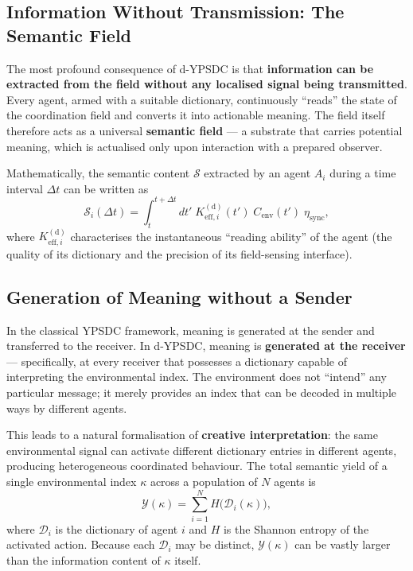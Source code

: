 \documentclass[12pt,a4paper]{article}
\theoremstyle{remark}
\begin{document}
	\subsection{Information Without Transmission: The Semantic Field}
	\label{subsec:semantic-field}
	
	The most profound consequence of d-YPSDC is that \textbf{information can be
		extracted from the field without any localised signal being transmitted}.
	Every agent, armed with a suitable dictionary, continuously ``reads'' the state
	of the coordination field and converts it into actionable meaning. The field
	itself therefore acts as a universal \textbf{semantic field} --- a substrate
	that carries potential meaning, which is actualised only upon interaction with
	a prepared observer.
	
	Mathematically, the semantic content $\mathcal{S}$ extracted by an agent $A_i$
	during a time interval $\Delta t$ can be written as
	\begin{equation}
		\mathcal{S}_i(\Delta t) = \int_{t}^{t+\Delta t} dt' \;
		K_{\mathrm{eff},i}^{\mathrm{(d)}}(t') \; C_{\mathrm{env}}(t') \; \eta_{\mathrm{sync}},
		\label{eq:semantic-content}
	\end{equation}
	where $K_{\mathrm{eff},i}^{\mathrm{(d)}}$ characterises the instantaneous
	``reading ability'' of the agent (the quality of its dictionary and the precision
	of its field-sensing interface).
	
	\subsection{Generation of Meaning without a Sender}
	\label{subsec:meaning-generation}
	
	In the classical YPSDC framework, meaning is generated at the sender and
	transferred to the receiver. In d-YPSDC, meaning is \textbf{generated at the
		receiver} --- specifically, at every receiver that possesses a dictionary capable
	of interpreting the environmental index. The environment does not ``intend'' any
	particular message; it merely provides an index that can be decoded in multiple
	ways by different agents.
	
	This leads to a natural formalisation of \textbf{creative interpretation}:
	the same environmental signal can activate different dictionary entries in
	different agents, producing heterogeneous coordinated behaviour. The total
	semantic yield of a single environmental index $\kappa$ across a population
	of $N$ agents is
	\begin{equation}
		\mathcal{Y}(\kappa) = \sum_{i=1}^{N} H\bigl(\mathcal{D}_i(\kappa)\bigr),
		\label{eq:semantic-yield}
	\end{equation}
	where $\mathcal{D}_i$ is the dictionary of agent $i$ and $H$ is the Shannon
	entropy of the activated action. Because each $\mathcal{D}_i$ may be distinct,
	$ \mathcal{Y}(\kappa)$ can be vastly larger than the information content of
	$\kappa$ itself.
	
\end{document}
